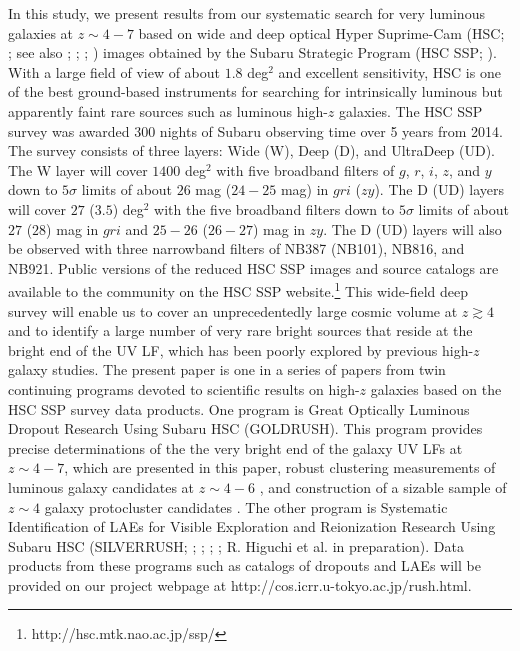 \documentclass[]{pasj01}
\begin{document}
In this study, 
we present results from our systematic search for 
very luminous galaxies at $z \sim 4-7$ 
based on 
wide and deep optical Hyper Suprime-Cam 
(HSC; \cite{2012SPIE.8446E..0ZM}; see also 
\cite{miyazaki2017}; 
\cite{komiyama2017}; 
\cite{furusawa2017}; 
\cite{kawanomoto2017}) 
images obtained by the Subaru Strategic Program 
(HSC SSP; \cite{2017arXiv170405858A}). 
With a large field of view of about $1.8$ deg$^2$ and excellent sensitivity, 
HSC is one of the best ground-based instruments 
for searching for intrinsically luminous but apparently faint rare sources such as luminous high-$z$ galaxies. 
%
The HSC SSP survey was 
awarded 300 nights of Subaru observing time over 5 years from 2014. 
The survey consists of three layers: Wide (W), Deep (D), and UltraDeep (UD).  
The W layer will cover $1400$ deg$^2$ 
with five broadband filters of $g$, $r$, $i$, $z$, and $y$ 
down to $5\sigma$ limits of about $26$ mag ($24-25$ mag) in $gri$ ($zy$). 
The D (UD) layers will cover $27$ ($3.5$) deg$^2$ 
with the five broadband filters 
down to $5\sigma$ limits of about $27$ ($28$) mag in $gri$ and $25-26$ ($26-27$) mag in $zy$. 
The D (UD) layers will also be observed with 
three narrowband filters of NB387 (NB101), NB816, and NB921. 
Public versions of the reduced HSC SSP images 
and source catalogs are available to the community 
on the HSC SSP website.\footnote{http://hsc.mtk.nao.ac.jp/ssp/}  
This wide-field deep survey will enable us 
to cover an unprecedentedly large cosmic volume at $z \gtrsim 4$ 
and 
to identify a large number of very rare bright sources that reside at the bright end of the UV LF, 
which has been poorly explored by previous high-$z$ galaxy studies. 
The present paper is 
one in a series of papers from twin continuing programs 
devoted to scientific results on high-$z$ galaxies 
based on the HSC SSP survey data products. 
%
One program is 
Great Optically Luminous Dropout Research Using Subaru HSC (GOLDRUSH). 
This program provides  
precise determinations of the the very bright end of the galaxy UV LFs at $z \sim 4-7$, 
which are presented in this paper, 
robust clustering measurements of luminous galaxy candidates at $z \sim 4-6$ 
\citep{2017arXiv170406535H}, 
and construction of a sizable sample of $z \sim 4$ galaxy protocluster candidates 
\citep{toshikawa2017}. 
The other program is 
Systematic Identification of LAEs for Visible Exploration and Reionization Research Using Subaru HSC 
(SILVERRUSH; 
\cite{2017arXiv170407455O}; \cite{2017arXiv170408140S}; \cite{2017arXiv170500733S}; \cite{2017arXiv170501222K}; 
R. Higuchi et al. in preparation). 
Data products from these programs such as catalogs of dropouts and LAEs 
will be provided on our project webpage at 
http:\slash\slash{}cos.icrr.u-tokyo.ac.jp\slash{}rush.html.
\end{document}

